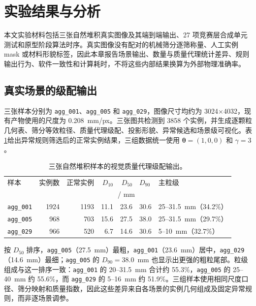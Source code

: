 \section{实验结果与分析}
\label{sec:r-results-final}

本文实验材料包括三张自然堆积真实图像及其端到端输出、27 项竞赛层合成单元测试和原型阶段算法时序。真实图像没有配对的机械筛分逐筛称量、人工实例 mask 或材料形貌标签，因此本章报告场景输出、数量与质量代理统计差异、规则输出行为、软件一致性和计算耗时，不将这些内部结果换算为外部物理准确率。

\subsection{真实场景的级配输出}

三张样本分别为 \texttt{agg\_001}、\texttt{agg\_005} 和 \texttt{agg\_029}，图像尺寸均约为 3024$\times$4032，现有产物使用的尺度为 0.208~mm/px。三张图共检测到 3858 个实例，并生成逐颗粒几何表、筛分等效粒径、质量代理级配、投影形貌、异常候选和场景级可视化。表\ref{tab:r-final-demo-main}给出异常规则筛选后的正常实例结果，三组数据统一使用 $\boldsymbol{\theta}=(1,0,0)$ 和 $\gamma=3$。

\begin{table}[t]
\centering
\caption{三张自然堆积样本的视觉质量代理级配输出。}
\label{tab:r-final-demo-main}
\footnotesize
\renewcommand{\arraystretch}{1.12}
\begin{tabular}{lrrrrll}
\toprule
样本 & 实例数 & 正常实例 & $D_{10}$ & $D_{50}$ & $D_{90}$ & 主粒级 \\
 & & & \multicolumn{3}{c}{/ mm} & \\
\midrule
\texttt{agg\_001} & 1924 & 1193 & 11.1 & 23.6 & 30.6 & 25--31.5~mm（34.2\%） \\
\texttt{agg\_005} & 968 & 703 & 15.6 & 27.5 & 38.0 & 25--31.5~mm（29.7\%） \\
\texttt{agg\_029} & 966 & 520 & 6.7 & 14.6 & 30.6 & 5--10~mm（32.7\%） \\
\bottomrule
\end{tabular}
\end{table}

按 $D_{50}$ 排序，\texttt{agg\_005}（27.5~mm）最粗，\texttt{agg\_001}（23.6~mm）居中，\texttt{agg\_029}（14.6~mm）最细；\texttt{agg\_005} 的 $D_{90}=38.0$~mm 也显示出更强的粗粒尾部。粒级组成与这一排序一致：\texttt{agg\_001} 的 20--31.5~mm 合计约 55.3\%，\texttt{agg\_005} 的 25--40~mm 约 55.6\%，而 \texttt{agg\_029} 的 5--16~mm 约 51.9\%。三组样本使用相同尺度口径、筛分映射和质量指数，因此这些差异来自各场景的实例几何组成及固定异常规则，而非逐场景调参。

